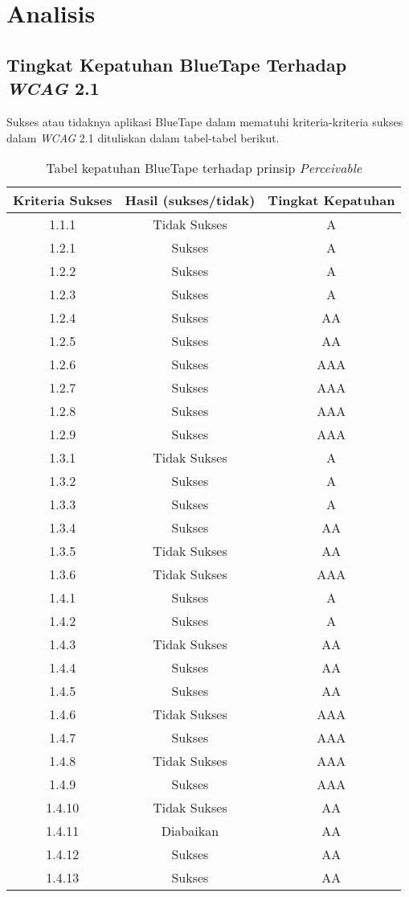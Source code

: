\chapter{Analisis}
\label{chap:analisis}

\section{Tingkat Kepatuhan BlueTape Terhadap \textit{WCAG} 2.1}
\label{sec:kepatuhan_bluetape_terhadap_wcag_2.1}
Sukses atau tidaknya aplikasi BlueTape dalam mematuhi kriteria-kriteria sukses dalam \textit{WCAG} 2.1 dituliskan dalam tabel-tabel berikut.
\begin{table}[H]
    \centering 
    \caption{Tabel kepatuhan BlueTape terhadap prinsip \textit{Perceivable}}
    \label{tab:kepatuhan_bluetape_perceivable}
    \begin{tabular}{|c|c|c|}
        \toprule
        Kriteria Sukses & Hasil (sukses/tidak) & Tingkat Kepatuhan \\

        \midrule
        1.1.1 & Tidak Sukses & A \\
        1.2.1 & Sukses & A \\
        1.2.2 & Sukses & A \\
        1.2.3 & Sukses & A \\
        1.2.4 & Sukses & AA \\
        1.2.5 & Sukses & AA \\
        1.2.6 & Sukses & AAA \\
        1.2.7 & Sukses & AAA \\
        1.2.8 & Sukses & AAA \\
        1.2.9 & Sukses & AAA \\
        1.3.1 & Tidak Sukses & A \\
        1.3.2 & Sukses & A \\
        1.3.3 & Sukses & A \\
        1.3.4 & Sukses & AA \\
        1.3.5 & Tidak Sukses & AA \\
        1.3.6 & Tidak Sukses & AAA \\
        1.4.1 & Sukses & A \\
        1.4.2 & Sukses & A \\
        1.4.3 & Tidak Sukses & AA \\
        1.4.4 & Sukses & AA \\
        1.4.5 & Sukses & AA \\
        1.4.6 & Tidak Sukses & AAA \\
        1.4.7 & Sukses & AAA \\
        1.4.8 & Tidak Sukses & AAA \\
        1.4.9 & Sukses & AAA \\
        1.4.10 & Tidak Sukses & AA \\
        1.4.11 & Diabaikan & AA \\
        1.4.12 & Sukses & AA \\
        1.4.13 & Sukses & AA \\
        

\end{tabular}
\end{table}
